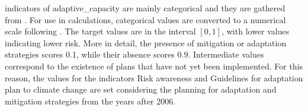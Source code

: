 \Glspl{indicator} of \gls{adaptive_capacity} are mainly categorical and they are gathered from \cite[66-79]{2015PudduCorporateSocial}. For use in calculations, categorical values are converted to a numerical scale following \cite[6]{2023DeVivoClimate-RiskAssessment}. The target values are in the interval $[0, 1]$, with lower values indicating lower \gls{risk}. More in detail, the presence of mitigation or adaptation strategies scores \num{0.1}, while their absence scores \num{0.9}. Intermediate values correspond to the existence of plans that have not yet been implemented. For this reason, the values for the indicators {Risk awareness} and {Guidelines for adaptation plan to climate change} are set considering the planning for adaptation and mitigation strategies from the years after 2006.
